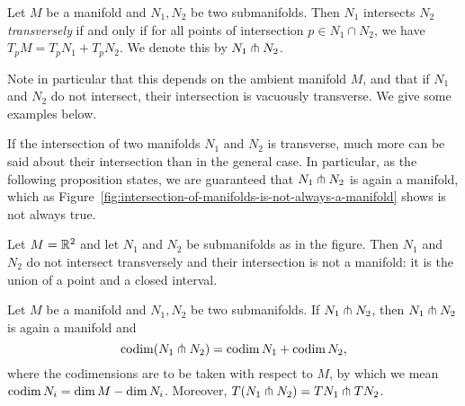 \begin{definition}[Transversality]
    Let $M$ be a manifold and $N_1, N_2$ be two submanifolds.
    Then $N_1$ intersects $N_2$ \emph{transversely} if and only if for all points of intersection $p \in N_1 \cap N_2$, we have
    $T_pM = T_pN_1 + T_p N_2$.
    We denote this by $ N_1 \pitchfork N_2$.\sidenotemark[0]
\end{definition}
Note in particular that this depends on the ambient manifold $M$, and that if $N_1$ and $N_2$ do not intersect, their intersection is vacuously transverse.
We give some examples below.
\begin{figure}[H]
    \centering
\end{figure}
If the intersection of two manifolds $ N_1$ and $N_2$ is transverse, much more can be said about their intersection than in the general case.
In particular, as the following proposition states, we are guaranteed that $N_1 \pitchfork N_2$ is again a manifold, which as Figure~\ref{fig:intersection-of-manifolds-is-not-always-a-manifold} shows is not always true.
\begin{marginfigure}
    \centering
    \caption{Let $M = \mathbb{R}^2$ and let $N_1$ and $N_2$ be submanifolds as in the figure. Then $N_1$ and $N_2$ do not intersect transversely and their intersection is not a manifold: it is the union of a point and a closed interval.}
    \label{fig:intersection-of-manifolds-is-not-always-a-manifold}
\end{marginfigure}
\begin{prop}
    Let $M$ be a manifold and $N_1, N_2$ be two submanifolds. If $ N_1 \pitchfork N_2$, then $ N_1 \pitchfork N_2$ is again a manifold and 
    \[
        \operatorname{codim} (N_1 \pitchfork N_2) = \operatorname{codim} N_1 + \operatorname{codim} N_2
    ,\] 
    where the codimensions are to be taken with respect to $M$, by which we mean $\operatorname{codim} N_i = \dim M - \dim N_i$.
    Moreover, $T(N_1\pitchfork N_2) = TN_1 \pitchfork TN_2$.
\label{prop:transverse-codimensions-add}
\end{prop}
